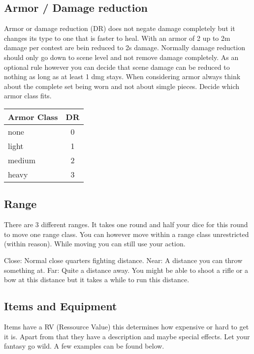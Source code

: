 \documentclass[11pt]{article}
\begin{document}
{\begin{multicols}{2}[]
\subsection{Armor / Damage reduction}
\label{sec:orgdcb5603}
Armor or damage reduction (DR) does not negate damage completely but it changes its type to one that is faster to heal. With an armor of 2 up to 2m damage per contest are bein reduced to 2s damage. Normally damage reduction should only go down to scene level and not remove damage completely. As an optional rule however you can decide that scene damage can be reduced to nothing as long as at least 1 dmg stays. When considering armor always think about the complete set being worn and not about simgle pieces. Decide which armor class fits.

\begin{center}
\begin{tabular}{l|c}
\textbf{Armor Class} & \textbf{DR}\\
\hline
none & 0\\
light & 1\\
medium & 2\\
heavy & 3\\
\end{tabular}
\end{center}

\subsection{Range}
\label{sec:orgd6a2e9a}
There are 3 different ranges. It takes one round and half your dice for this round to move one range class. You can however move within a range class unrestricted (within reason). While moving you can still use your action.

Close: Normal close quarters fighting distance.
Near: A distance you can throw something at.
Far: Quite a distance away. You might be able to shoot a rifle or a bow at this distance but it takes a while to run this distance.

\subsection{Items and Equipment}
\label{sec:org8492c64}

Items have a RV (Ressource Value) this determines how expensive or hard to get it is. Apart from that they have a description and maybe special effects. Let your fantasy go wild. A few examples can be found below.


\end{multicols}}
\end{document}
